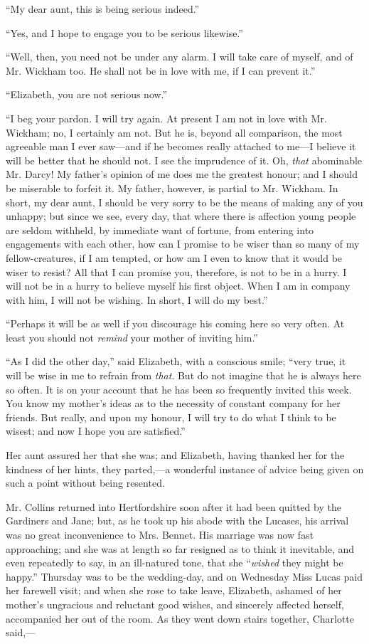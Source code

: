 \documentclass[12pt,openright]{book}
\begin{document}
“My dear aunt, this is being serious indeed.”

“Yes, and I hope to engage you to be serious likewise.”

“Well, then, you need not be under any alarm. I will take care of myself, and of Mr. Wickham too. He shall not be in love with me, if I can prevent it.”

“Elizabeth, you are not serious now.”

“I beg your pardon. I will try again. At present I am not in love with Mr. Wickham; no, I certainly am not. But he is, beyond all comparison, the most agreeable man I ever saw—and if he becomes really attached to me—I believe it will be better that he should not. I see the imprudence of it. Oh, \textit{that} abominable Mr. Darcy! My father’s opinion of me does me the greatest honour; and I should be miserable to forfeit it. My father, however, is partial to Mr. Wickham. In short, my dear aunt, I should be very sorry to be the means of making any of you unhappy; but since we see, every day, that where there is affection young people are seldom withheld, by immediate want of fortune, from entering into engagements with each other, how can I promise to be wiser than so many of my fellow-creatures, if I am tempted, or how am I even to know that it would be wiser to resist? All that I can promise you, therefore, is not to be in a hurry. I will not be in a hurry to believe myself his first object. When I am in company with him, I will not be wishing. In short, I will do my best.”

“Perhaps it will be as well if you discourage his coming here so very often. At least you should not \textit{remind} your mother of inviting him.”

“As I did the other day,” said Elizabeth, with a conscious smile; “very true, it will be wise in me to refrain from \textit{that}. But do not imagine that he is always here so often. It is on your account that he has been so frequently invited this week. You know my mother’s ideas as to the necessity of constant company for her friends. But really, and upon my honour, I will try to do what I think to be wisest; and now I hope you are satisfied.”

Her aunt assured her that she was; and Elizabeth, having thanked her for the kindness of her hints, they parted,—a wonderful instance of advice being given on such a point without being resented.

Mr. Collins returned into Hertfordshire soon after it had been quitted by the Gardiners and Jane; but, as he took up his abode with the Lucases, his arrival was no great inconvenience to Mrs. Bennet. His marriage was now fast approaching; and she was at length so far resigned as to think it inevitable, and even repeatedly to say, in an ill-natured tone, that she “\textit{wished} they might be happy.” Thursday was to be the wedding-day, and on Wednesday Miss Lucas paid her farewell visit; and when she rose to take leave, Elizabeth, ashamed of her mother’s ungracious and reluctant good wishes, and sincerely affected herself, accompanied her out of the room. As they went down stairs together, Charlotte said,—
\end{document}
